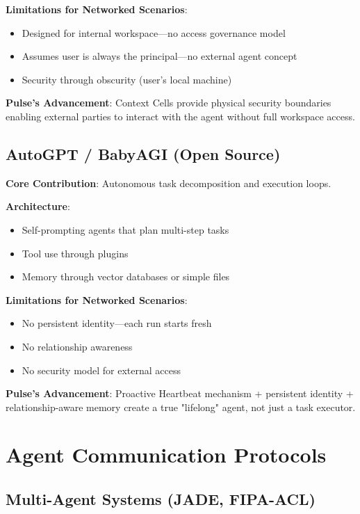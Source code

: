 \textbf{Limitations for Networked Scenarios}:
\begin{itemize}
    \item Designed for internal workspace—no access governance model
    \item Assumes user is always the principal—no external agent concept
    \item Security through obscurity (user's local machine)
\end{itemize}

\textbf{Pulse's Advancement}: Context Cells provide physical security boundaries enabling external parties to interact with the agent without full workspace access.

\subsection{AutoGPT / BabyAGI (Open Source)}

\textbf{Core Contribution}: Autonomous task decomposition and execution loops.

\textbf{Architecture}:
\begin{itemize}
    \item Self-prompting agents that plan multi-step tasks
    \item Tool use through plugins
    \item Memory through vector databases or simple files
\end{itemize}

\textbf{Limitations for Networked Scenarios}:
\begin{itemize}
    \item No persistent identity—each run starts fresh
    \item No relationship awareness
    \item No security model for external access
\end{itemize}

\textbf{Pulse's Advancement}: Proactive Heartbeat mechanism + persistent identity + relationship-aware memory create a true "lifelong" agent, not just a task executor.

\section{Agent Communication Protocols}

\subsection{Multi-Agent Systems (JADE, FIPA-ACL)}

